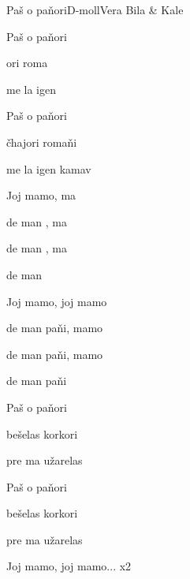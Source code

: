\begin{song}{Paš o paňori}{D-moll}{}{Vera Bila \& Kale}{}{}

  \begin{SBVerse}
    Paš o paňori

    ori roma

    me la igen 

    Paš o paňori

    čhajori romaňi

    me la igen kamav
  \end{SBVerse}

  \begin{SBChorus}
    Joj mamo,  ma

    de man , ma

    de man , ma

    de man 

    Joj mamo, joj mamo

    de man paňi, mamo

    de man paňi, mamo

    de man paňi
  \end{SBChorus}

  \begin{SBVerse}
    Paš o paňori

    bešelas korkori

    pre ma užarelas

    Paš o paňori

    bešelas korkori

    pre ma užarelas
  \end{SBVerse}

  \begin{SBChorus}
    Joj mamo, joj mamo... x2
  \end{SBChorus}

\end{song}
